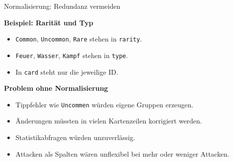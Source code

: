 \documentclass[aspectratio=169,11pt]{beamer}
\begin{document}
\begin{frame}{Normalisierung: Redundanz vermeiden}
  \begin{minipage}[t]{0.49\textwidth}
    \begin{panel}[colback=softgreen,colframe=green!40,height=5.85cm]
      {\bfseries Beispiel: Rarit\"at und Typ}\par
      \begin{itemize}
        \item \texttt{Common}, \texttt{Uncommon}, \texttt{Rare} stehen in \texttt{rarity}.
        \item \texttt{Feuer}, \texttt{Wasser}, \texttt{Kampf} stehen in \texttt{type}.
        \item In \texttt{card} steht nur die jeweilige ID.
      \end{itemize}
    \end{panel}
  \end{minipage}\hfill
  \begin{minipage}[t]{0.49\textwidth}
    \begin{panel}[colback=softred,colframe=accent!40,height=5.85cm]
      {\bfseries Problem ohne Normalisierung}\par
      \begin{itemize}
        \item Tippfehler wie \texttt{Uncommen} w\"urden eigene Gruppen erzeugen.
        \item \"Anderungen m\"ussten in vielen Kartenzeilen korrigiert werden.
        \item Statistikabfragen w\"urden unzuverl\"assig.
        \item Attacken als Spalten w\"aren unflexibel bei mehr oder weniger Attacken.
      \end{itemize}
    \end{panel}
  \end{minipage}
\end{frame}
\end{document}

